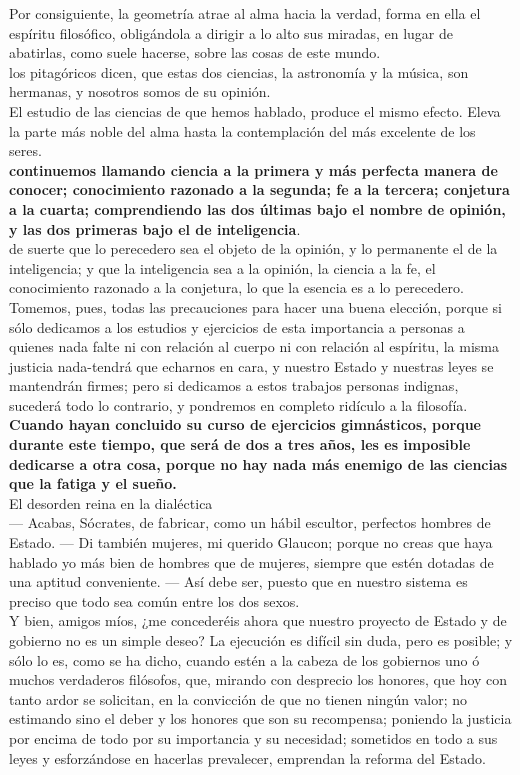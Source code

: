 \documentclass[10pt]{book}
\begin{document}
Por consiguiente, la geometría atrae al alma hacia la verdad, forma en ella el espíritu filosófico, obligándola a dirigir a lo alto sus miradas, en lugar de abatirlas, como suele hacerse, sobre las cosas de este mundo. \\
los pitagóricos dicen, que estas dos ciencias, la astronomía y la música, son hermanas, y nosotros
somos de su opinión.\\
El estudio de las ciencias de que hemos hablado, produce el mismo efecto. Eleva la parte más noble del alma hasta la contemplación del más excelente de los seres.\\
\textbf{continuemos llamando ciencia a la primera y más perfecta manera de conocer; conocimiento razonado a la segunda; fe a la tercera; conjetura a la cuarta; comprendiendo las dos últimas bajo el nombre de opinión, y las dos primeras bajo el de inteligencia}.\\
de suerte que lo perecedero sea el objeto de la opinión, y lo permanente el de la inteligencia; y que la inteligencia sea a la opinión, la ciencia a la fe, el conocimiento razonado a la conjetura, lo que la esencia es a lo perecedero. \\
Tomemos, pues, todas las precauciones para hacer una buena elección, porque si sólo dedicamos a los estudios y ejercicios de esta importancia a personas a quienes nada falte ni con relación al cuerpo ni con relación al espíritu, la misma justicia nada-tendrá que echarnos en cara, y nuestro Estado y nuestras leyes se mantendrán firmes; pero si dedicamos a estos trabajos personas indignas, sucederá todo lo contrario, y pondremos en completo ridículo a la filosofía. \\
\textbf{ Cuando hayan concluido su curso de ejercicios gimnásticos, porque durante este tiempo, que será de dos a tres años, les es imposible dedicarse a otra cosa, porque no hay nada más enemigo de las ciencias que la fatiga y el sueño. }\\
El desorden reina en la  dialéctica\\
— Acabas, Sócrates, de fabricar, como un hábil escultor, perfectos hombres de Estado. — Di también mujeres, mi querido Glaucon; porque no creas que haya hablado yo más bien de hombres que de mujeres, siempre que estén dotadas de una aptitud conveniente. — Así debe ser, puesto que en nuestro sistema es preciso que todo sea común entre los dos sexos. \\
Y bien, amigos míos, ¿me concederéis ahora que nuestro proyecto de Estado y de gobierno no es un simple deseo? La ejecución es difícil sin duda, pero es posible; y sólo lo es, como se ha dicho, cuando estén a la cabeza de los gobiernos uno ó muchos verdaderos filósofos, que, mirando con desprecio los honores, que hoy con tanto ardor se solicitan, en la convicción de que no tienen ningún valor; no estimando sino el deber y los honores que son su recompensa; poniendo la justicia por encima de todo por su importancia y su necesidad; sometidos en todo a sus leyes y esforzándose en hacerlas prevalecer, emprendan la reforma del Estado. 
\end{document}
